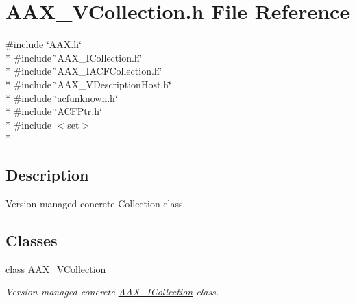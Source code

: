 \hypertarget{a00302}{}\section{A\+A\+X\+\_\+\+V\+Collection.\+h File Reference}
\label{a00302}
{\ttfamily \#include \char`\"{}A\+A\+X.\+h\char`\"{}}\\*
{\ttfamily \#include \char`\"{}A\+A\+X\+\_\+\+I\+Collection.\+h\char`\"{}}\\*
{\ttfamily \#include \char`\"{}A\+A\+X\+\_\+\+I\+A\+C\+F\+Collection.\+h\char`\"{}}\\*
{\ttfamily \#include \char`\"{}A\+A\+X\+\_\+\+V\+Description\+Host.\+h\char`\"{}}\\*
{\ttfamily \#include \char`\"{}acfunknown.\+h\char`\"{}}\\*
{\ttfamily \#include \char`\"{}A\+C\+F\+Ptr.\+h\char`\"{}}\\*
{\ttfamily \#include $<$set$>$}\\*


\subsection{Description}
Version-\/managed concrete Collection class. 

\subsection*{Classes}
\begin{DoxyCompactItemize}
\item 
class \hyperlink{a00130}{A\+A\+X\+\_\+\+V\+Collection}
\begin{DoxyCompactList}\small\item\em Version-\/managed concrete \hyperlink{a00087}{A\+A\+X\+\_\+\+I\+Collection} class. \end{DoxyCompactList}\end{DoxyCompactItemize}
